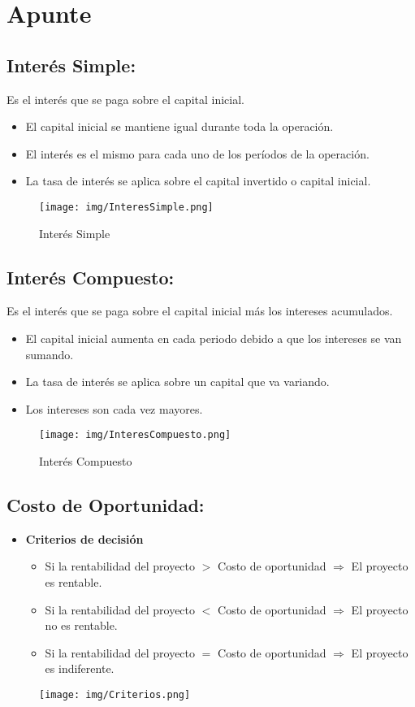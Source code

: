 \documentclass{templateNote}
\begin{document}
\section{Apunte}
\subsection*{Interés Simple:}
Es el interés que se paga sobre el capital inicial.
\begin{itemize}
    \item El capital inicial se mantiene igual durante toda la operación.
    \item El interés es el mismo para cada uno de los períodos de la operación.
    \item La tasa de interés se aplica sobre el capital invertido o capital inicial.
\end{itemize}
\begin{figure}[H]
    \centering
    \texttt{[image: img/InteresSimple.png]}
    \caption{Interés Simple}
\end{figure}

\subsection*{Interés Compuesto:}
Es el interés que se paga sobre el capital inicial más los intereses acumulados.
\begin{itemize}
    \item El capital inicial aumenta en cada periodo debido a que los intereses se van sumando.
    \item La tasa de interés se aplica sobre un capital que va variando.
    \item Los intereses son cada vez mayores.
\end{itemize}
\begin{figure}[H]
    \centering
    \texttt{[image: img/InteresCompuesto.png]}
    \caption{Interés Compuesto}
\end{figure}

\newpage
\subsection*{Costo de Oportunidad:}
\begin{itemize}
    \item \textbf{Criterios de decisión}
    \begin{itemize}
        \item Si la rentabilidad del proyecto $ > $ Costo de oportunidad $\Rightarrow$ El proyecto es rentable.
        \item Si la rentabilidad del proyecto $ < $ Costo de oportunidad $\Rightarrow$ El proyecto no es rentable.
        \item Si la rentabilidad del proyecto $ = $ Costo de oportunidad $\Rightarrow$ El proyecto es indiferente.
    \end{itemize}
\end{itemize}
\begin{figure}[H]
    \centering
    \texttt{[image: img/Criterios.png]}
\end{figure}
\end{document}
